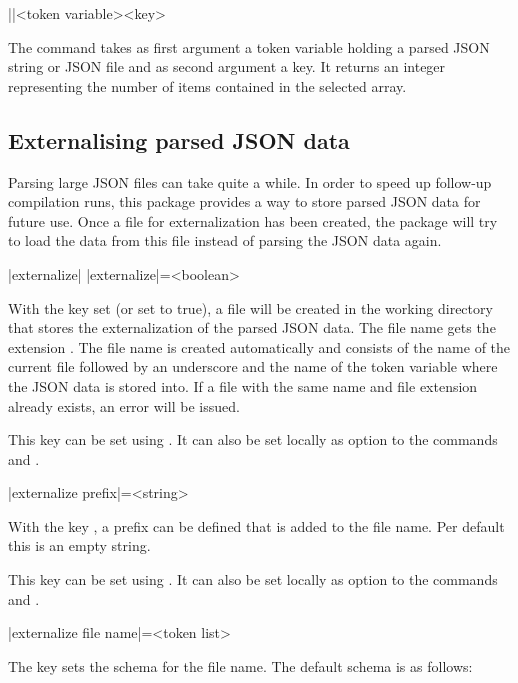 \documentclass[a4paper]{article}
\begin{document}
{{\begin{macrodef}
|\JSONParseArrayCount|{<token variable>}{<key>}
\end{macrodef}
The command \macro{\JSONParseArrayCount} takes as first argument a token variable holding a parsed JSON string or JSON file and as second argument a key. It returns an integer representing the number of items contained in the selected array.

\subsection{Externalising parsed JSON data}\label{sec:externalizing}

Parsing large JSON files can take quite a while. In order to speed up follow-up compilation runs, this package provides a way to store parsed JSON data for future use. Once a file for externalization has been created, the package will try to load the data from this file instead of parsing the JSON data again. 

\begin{macrodef}
|externalize|
|externalize|={<boolean>}
\end{macrodef}
With the key  set (or set to true), a file will be created in the working directory that stores the externalization of the parsed JSON data. The file name gets the extension . The file name is created automatically and consists of the name of the current file followed by an underscore and the name of the token variable where the JSON data is stored into. If a file with the same name and file extension already exists, an error will be issued. 

This key can be set using \macro{\JSONParseSet}. It can also be set locally as option to the commands \macro{\JSONParse} and \macro{\JSONParseFromFile}.

\begin{macrodef}
|externalize prefix|={<string>}
\end{macrodef}
With the key , a prefix can be defined that is added to the file name. Per default this is an empty string.

This key can be set using \macro{\JSONParseSet}. It can also be set locally as option to the commands \macro{\JSONParse} and \macro{\JSONParseFromFile}.

\begin{macrodef}
|externalize file name|={<token list>}
\end{macrodef}
The key  sets the schema for the file name. The default schema is as follows:

}}
\end{document}
